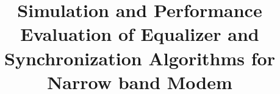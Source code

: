 \documentclass[journal,12pt,onecolumn]{IEEEtran}
\begin{document}
        \def\inputGnumericTable{}                                 %

\title{Simulation and Performance Evaluation of Equalizer and Synchronization Algorithms for  Narrow band Modem}


%
%
%

% 
%



% 
\end{document}
